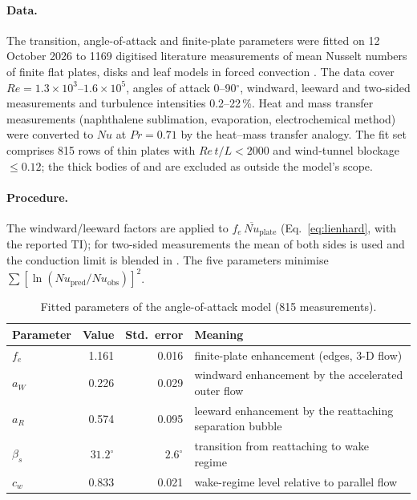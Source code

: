 \documentclass[11pt,a4paper]{article}
\newcommand{\Nu}{\mathit{Nu}}
\newcommand{\Rey}{\mathit{Re}}
\newcommand{\Prn}{\mathit{Pr}}
\begin{document}
\paragraph{Data.} The transition, angle-of-attack and finite-plate parameters were fitted on 12 October 2026 to 1169 digitised literature measurements of mean Nusselt numbers of finite flat plates, disks and leaf models in forced convection \citep{chen1988a,chen1988b,haseba1973,haseba1984,sparrow1977,sparrow1979,parkhurst1968,powell1940,schuepp1993,ramirez2002,kobus2006,motwani1985,ausderwiesche2016}. The data cover $\Rey = \ensuremath{1.3\times10^{3}}$--\ensuremath{1.6\times10^{5}}, angles of attack 0--90$^\circ$, windward, leeward and two-sided measurements and turbulence intensities 0.2--22\,\%. Heat and mass transfer measurements (naphthalene sublimation, evaporation, electrochemical method) were converted to $\Nu$ at $\Prn = 0.71$ by the heat--mass transfer analogy. The fit set comprises 815 rows of thin plates with $\Rey\,t/L<2000$ and wind-tunnel blockage $\le0.12$; the thick bodies of \citet{ausderwiesche2016} and \citet{motwani1985} are excluded as outside the model's scope.

\paragraph{Procedure.} The windward/leeward factors are applied to $f_e\,\overline{\Nu}_{\mathrm{plate}}$ (Eq.~\ref{eq:lienhard}, with the reported TI); for two-sided measurements the mean of both sides is used and the conduction limit is blended in \citep{yovanovich1993}. The five parameters minimise $\sum[\ln(\Nu_{\mathrm{pred}}/\Nu_{\mathrm{obs}})]^2$.

\begin{table}[ht]
\centering\small
\caption{Fitted parameters of the angle-of-attack model (815 measurements).}\label{tab:angleparams}
\begin{tabular}{l r r l}
\toprule
Parameter & Value & Std.\ error & Meaning\\
\midrule
$f_e$ & 1.161 & 0.016 & finite-plate enhancement (edges, 3-D flow)\\
$a_W$ & 0.226 & 0.029 & windward enhancement by the accelerated outer flow\\
$a_R$ & 0.574 & 0.095 & leeward enhancement by the reattaching separation bubble\\
$\beta_s$ & $31.2^\circ$ & $2.6^\circ$ & transition from reattaching to wake regime\\
$c_w$ & 0.833 & 0.021 & wake-regime level relative to parallel flow\\
\bottomrule
\end{tabular}
\end{table}
\end{document}
